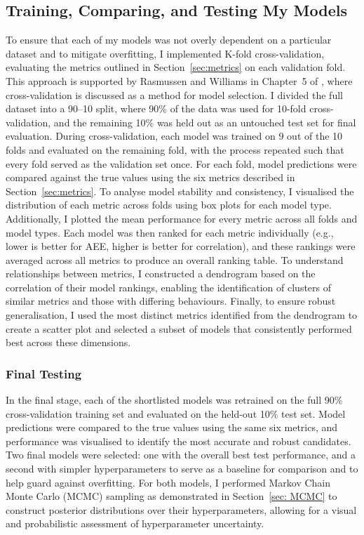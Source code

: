\documentclass[11pt]{article}
\begin{document}
\subsection{Training, Comparing, and Testing My Models}

To ensure that each of my models was not overly dependent on a particular dataset and to mitigate overfitting, I implemented K-fold cross-validation, evaluating the metrics outlined in Section~\ref{sec:metrics} on each validation fold. This approach is supported by Rasmussen and Williams in Chapter~5 of \cite{bible}, where cross-validation is discussed as a method for model selection.
I divided the full dataset into a 90--10 split, where 90\% of the data was used for 10-fold cross-validation, and the remaining 10\% was held out as an untouched test set for final evaluation.
During cross-validation, each model was trained on 9 out of the 10 folds and evaluated on the remaining fold, with the process repeated such that every fold served as the validation set once. For each fold, model predictions were compared against the true values using the six metrics described in Section~\ref{sec:metrics}.
To analyse model stability and consistency, I visualised the distribution of each metric across folds using box plots for each model type. Additionally, I plotted the mean performance for every metric across all folds and model types.
Each model was then ranked for each metric individually (e.g., lower is better for AEE, higher is better for correlation), and these rankings were averaged across all metrics to produce an overall ranking table. To understand relationships between metrics, I constructed a dendrogram based on the correlation of their model rankings, enabling the identification of clusters of similar metrics
 and those with differing behaviours. Finally, to ensure robust generalisation, I used the most distinct metrics identified from the dendrogram to create a scatter plot and selected a subset of models that consistently performed best across these dimensions.

 \subsubsection*{Final Testing}
 In the final stage, each of the shortlisted models was retrained on the full 90\% cross-validation training set and evaluated on the held-out 10\% test set. Model predictions were compared to the true values using the same six metrics, and performance was visualised to identify the most accurate and robust candidates.
 Two final models were selected: one with the overall best test performance, and a second with simpler hyperparameters to serve as a baseline for comparison and to help guard against overfitting. For both models, I performed Markov Chain Monte Carlo (MCMC) sampling as demonstrated in Section~\ref{sec: MCMC}
to construct posterior distributions over their hyperparameters, allowing for a visual and probabilistic assessment of hyperparameter uncertainty.
 
\end{document}
